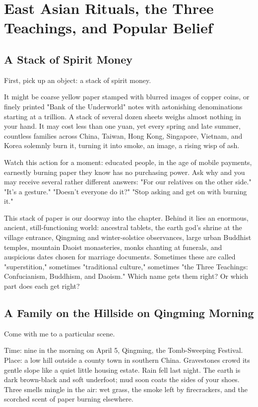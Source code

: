 \chapter[East Asian Ritual and Popular Belief]{East Asian Rituals, the Three Teachings, and Popular Belief}
\section{A Stack of Spirit Money}
First, pick up an object: a stack of spirit money.

It might be coarse yellow paper stamped with blurred images of copper coins, or finely printed "Bank of the Underworld" notes with astonishing denominations starting at a trillion. A stack of several dozen sheets weighs almost nothing in your hand. It may cost less than one yuan, yet every spring and late summer, countless families across China, Taiwan, Hong Kong, Singapore, Vietnam, and Korea solemnly burn it, turning it into smoke, an image, a rising wisp of ash.

Watch this action for a moment: educated people, in the age of mobile payments, earnestly burning paper they know has no purchasing power. Ask why and you may receive several rather different answers: "For our relatives on the other side." "It's a gesture." "Doesn't everyone do it?" "Stop asking and get on with burning it."

This stack of paper is our doorway into the chapter. Behind it lies an enormous, ancient, still-functioning world: ancestral tablets, the earth god's shrine at the village entrance, Qingming and winter-solstice observances, large urban Buddhist temples, mountain Daoist monasteries, monks chanting at funerals, and auspicious dates chosen for marriage documents. Sometimes these are called "superstition," sometimes "traditional culture," sometimes "the Three Teachings: Confucianism, Buddhism, and Daoism." Which name gets them right? Or which part does each get right?

\section{A Family on the Hillside on Qingming Morning}
Come with me to a particular scene.

Time: nine in the morning on April 5, Qingming, the Tomb-Sweeping Festival. Place: a low hill outside a county town in southern China. Gravestones crowd its gentle slope like a quiet little housing estate. Rain fell last night. The earth is dark brown-black and soft underfoot; mud soon coats the sides of your shoes. Three smells mingle in the air: wet grass, the smoke left by firecrackers, and the scorched scent of paper burning elsewhere.

